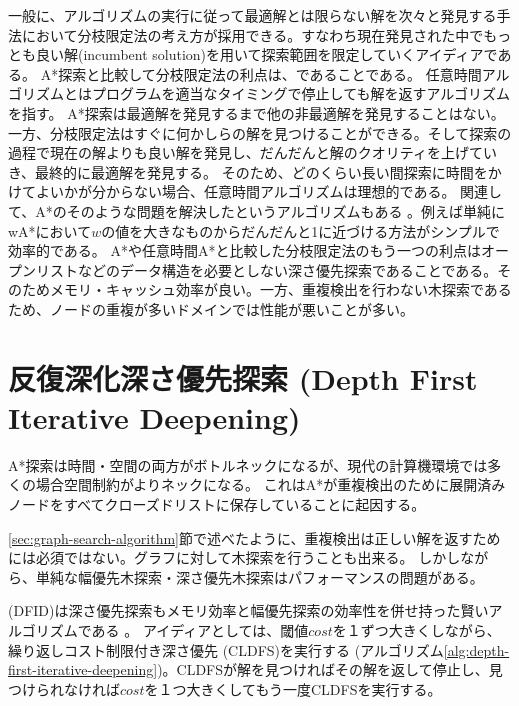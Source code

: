 一般に、アルゴリズムの実行に従って最適解とは限らない解を次々と発見する手法において分枝限定法の考え方が採用できる。すなわち現在発見された中でもっとも良い解(incumbent solution)を用いて探索範囲を限定していくアイディアである。
A*探索と比較して分枝限定法の利点は、であることである。
任意時間アルゴリズムとはプログラムを適当なタイミングで停止しても解を返すアルゴリズムを指す。
A*探索は最適解を発見するまで他の非最適解を発見することはない。一方、分枝限定法はすぐに何かしらの解を見つけることができる。そして探索の過程で現在の解よりも良い解を発見し、だんだんと解のクオリティを上げていき、最終的に最適解を発見する。
そのため、どのくらい長い間探索に時間をかけてよいかが分からない場合、任意時間アルゴリズムは理想的である。
関連して、A*のそのような問題を解決したというアルゴリズムもある \cite{likhachev2004ara,hansen2007anytime,richter2010joy}。例えば単純にwA*において$w$の値を大きなものからだんだんと1に近づける方法がシンプルで効率的である。
A*や任意時間A*と比較した分枝限定法のもう一つの利点はオープンリストなどのデータ構造を必要としない深さ優先探索であることである。そのためメモリ・キャッシュ効率が良い。一方、重複検出を行わない木探索であるため、ノードの重複が多いドメインでは性能が悪いことが多い。


\section{反復深化深さ優先探索 (Depth First Iterative Deepening)}
\label{sec:depth-first-iterative-deepening}
A*探索は時間・空間の両方がボトルネックになるが、現代の計算機環境では多くの場合空間制約がよりネックになる。
これはA*が重複検出のために展開済みノードをすべてクローズドリストに保存していることに起因する。

\ref{sec:graph-search-algorithm}節で述べたように、重複検出は正しい解を返すためには必須ではない。グラフに対して木探索を行うことも出来る。
しかしながら、単純な幅優先木探索・深さ優先木探索はパフォーマンスの問題がある。

 (DFID)は深さ優先探索もメモリ効率と幅優先探索の効率性を併せ持った賢いアルゴリズムである \cite{korf:85a,russelln03}。
アイディアとしては、閾値$cost$を１ずつ大きくしながら、繰り返しコスト制限付き深さ優先 (CLDFS)を実行する (アルゴリズム\ref{alg:depth-first-iterative-deepening})。CLDFSが解を見つければその解を返して停止し、見つけられなければ$cost$を１つ大きくしてもう一度CLDFSを実行する。

